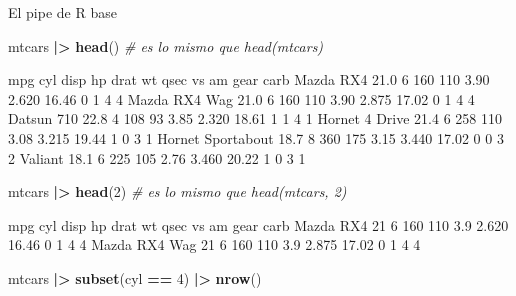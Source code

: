 \documentclass[
  ignorenonframetext,
  aspectratio=169]{beamer}
\newenvironment{Shaded}{\begin{snugshade}}{\end{snugshade}}
\newcommand{\CommentTok}[1]{\textcolor[rgb]{0.56,0.35,0.01}{\textit{#1}}}
\newcommand{\DecValTok}[1]{\textcolor[rgb]{0.00,0.00,0.81}{#1}}
\newcommand{\FunctionTok}[1]{\textcolor[rgb]{0.13,0.29,0.53}{\textbf{#1}}}
\newcommand{\NormalTok}[1]{#1}
\newcommand{\SpecialCharTok}[1]{\textcolor[rgb]{0.81,0.36,0.00}{\textbf{#1}}}
\let\oldverbatim\verbatim
\let\endoldverbatim\endverbatim
\renewenvironment{verbatim}{\tiny\oldverbatim}{\endoldverbatim}
\begin{document}
\begin{frame}[fragile]{El pipe de R base}
\label{el-pipe-de-r-base}
\begin{Shaded}
\begin{Highlighting}[]
\NormalTok{mtcars }\SpecialCharTok{|\textgreater{}} \FunctionTok{head}\NormalTok{()  }\CommentTok{\#  es lo mismo que head(mtcars)}
\end{Highlighting}
\end{Shaded}

\begin{verbatim}
                   mpg cyl disp  hp drat    wt  qsec vs am gear carb
Mazda RX4         21.0   6  160 110 3.90 2.620 16.46  0  1    4    4
Mazda RX4 Wag     21.0   6  160 110 3.90 2.875 17.02  0  1    4    4
Datsun 710        22.8   4  108  93 3.85 2.320 18.61  1  1    4    1
Hornet 4 Drive    21.4   6  258 110 3.08 3.215 19.44  1  0    3    1
Hornet Sportabout 18.7   8  360 175 3.15 3.440 17.02  0  0    3    2
Valiant           18.1   6  225 105 2.76 3.460 20.22  1  0    3    1
\end{verbatim}

\begin{Shaded}
\begin{Highlighting}[]
\NormalTok{mtcars }\SpecialCharTok{|\textgreater{}} \FunctionTok{head}\NormalTok{(}\DecValTok{2}\NormalTok{) }\CommentTok{\#  es lo mismo que  head(mtcars, 2)}
\end{Highlighting}
\end{Shaded}

\begin{verbatim}
              mpg cyl disp  hp drat    wt  qsec vs am gear carb
Mazda RX4      21   6  160 110  3.9 2.620 16.46  0  1    4    4
Mazda RX4 Wag  21   6  160 110  3.9 2.875 17.02  0  1    4    4
\end{verbatim}

\begin{Shaded}
\begin{Highlighting}[]
\NormalTok{mtcars }\SpecialCharTok{|\textgreater{}} \FunctionTok{subset}\NormalTok{(cyl }\SpecialCharTok{==} \DecValTok{4}\NormalTok{) }\SpecialCharTok{|\textgreater{}} \FunctionTok{nrow}\NormalTok{()  }
\end{Highlighting}
\end{Shaded}

\begin{verbatim}
[1] 11
\end{verbatim}
\end{frame}
\end{document}
